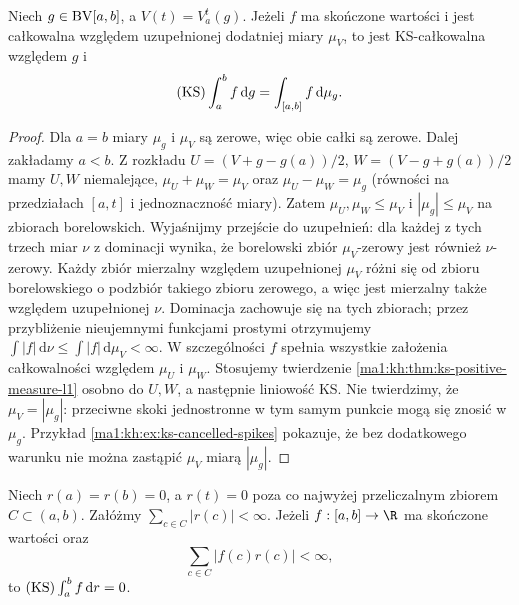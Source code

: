 \begin{wniosek}\label{ma1:kh:cor:ks-variation-measure-l1}
Niech $g\in\mathrm{BV}[a,b]$, a $V(t)=V_a^t(g)$. Jeżeli $f$ ma skończone wartości i jest całkowalna względem uzupełnionej dodatniej miary $\mu_V$, to jest KS-całkowalna względem $g$ i
\[
 (\mathrm{KS})\int_a^b f\,\mathrm dg=\int_{[a,b]}f\,\mathrm d\mu_g.
\]
\end{wniosek}
\begin{proof}
Dla $a=b$ miary $\mu_g$ i $\mu_V$ są zerowe, więc obie całki są zerowe. Dalej zakładamy $a<b$. Z rozkładu $U=(V+g-g(a))/2$, $W=(V-g+g(a))/2$ mamy $U,W$ niemalejące, $\mu_U+\mu_W=\mu_V$ oraz $\mu_U-\mu_W=\mu_g$ (równości na przedziałach $[a,t]$ i jednoznaczność miary). Zatem $\mu_U,\mu_W\le\mu_V$ i $|\mu_g|\le\mu_V$ na zbiorach borelowskich. Wyjaśnijmy przejście do uzupełnień: dla każdej z tych trzech miar $\nu$ z dominacji wynika, że borelowski zbiór $\mu_V$-zerowy jest również $\nu$-zerowy. Każdy zbiór mierzalny względem uzupełnionej $\mu_V$ różni się od zbioru borelowskiego o podzbiór takiego zbioru zerowego, a więc jest mierzalny także względem uzupełnionej $\nu$. Dominacja zachowuje się na tych zbiorach; przez przybliżenie nieujemnymi funkcjami prostymi otrzymujemy $\int|f|\,\mathrm d\nu\le\int|f|\,\mathrm d\mu_V<\infty$. W szczególności $f$ spełnia wszystkie założenia całkowalności względem $\mu_U$ i $\mu_W$. Stosujemy twierdzenie \ref{ma1:kh:thm:ks-positive-measure-l1} osobno do $U,W$, a następnie liniowość KS. Nie twierdzimy, że $\mu_V=|\mu_g|$: przeciwne skoki jednostronne w tym samym punkcie mogą się znosić w $\mu_g$. Przykład \ref{ma1:kh:ex:ks-cancelled-spikes} pokazuje, że bez dodatkowego warunku nie można zastąpić $\mu_V$ miarą $|\mu_g|$.
\end{proof}
\begin{lemat}\label{ma1:kh:lem:ks-point-spikes}
Niech $r(a)=r(b)=0$, a $r(t)=0$ poza co najwyżej przeliczalnym zbiorem $C\subset(a,b)$. Załóżmy $\sum_{c\in C}|r(c)|<\infty$. Jeżeli $f:[a,b]\to\R$ ma skończone wartości oraz
\[
 \sum_{c\in C}|f(c)r(c)|<\infty,
\]
to $(\mathrm{KS})\int_a^b f\,\mathrm dr=0$.
\end{lemat}

